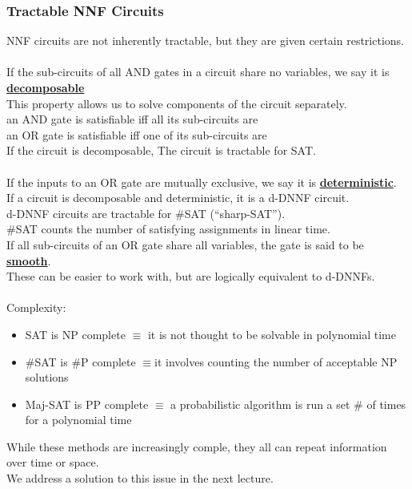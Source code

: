 \documentclass[../../lecture_notes.tex]{subfiles}
\begin{document}
\subsubsection*{Tractable NNF Circuits}
\noindent NNF circuits are not inherently tractable, but they are given certain restrictions.\\
\\
If the sub-circuits of all AND gates in a circuit share no variables, we say it is \textbf{\underline{decomposable}}\\
This property allows us to solve components of the circuit separately.\\
	\indent an AND gate is satisfiable iff all its sub-circuits are\\
	\indent an OR gate is satisfiable iff one of its sub-circuits are\\
If the circuit is decomposable, The circuit is tractable for SAT.\\
\\
If the inputs to an OR gate are mutually exclusive, we say it is \textbf{\underline{deterministic}}.\\
If a circuit is decomposable and deterministic, it is a d-DNNF circuit.\\
\indent d-DNNF circuits are tractable for \#SAT (“sharp-SAT”).\\
\indent \indent \#SAT counts the number of satisfying assignments in linear time.\\

\noindent If all sub-circuits of an OR gate share all variables, the gate is said to be \textbf{\underline{smooth}}.\\
\indent These can be easier to work with, but are logically equivalent to d-DNNFs.\\
\\
Complexity:
\begin{itemize} [itemsep=0mm]
	\item SAT is NP complete
	        $\equiv$ it is not thought to be solvable in polynomial time
	\item \#SAT is \#P complete
		$\equiv$it involves counting the number of acceptable NP solutions
	\item Maj-SAT is PP complete 
		$\equiv$ a probabilistic algorithm is run a set \# of times for a polynomial time 
\end{itemize}
\noindent While these methods are increasingly comple, they all can repeat information over time or space.\\
We address a solution to this issue in the next lecture.
\end{document}
